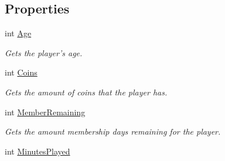 \subsection*{Properties}
\begin{DoxyCompactItemize}
\item 
\hypertarget{classSharpenguin_1_1Data_1_1MyPlayer_ae78b8a9ecf05afedb7baed1336e82dee}{int \hyperlink{classSharpenguin_1_1Data_1_1MyPlayer_ae78b8a9ecf05afedb7baed1336e82dee}{Age}}\label{classSharpenguin_1_1Data_1_1MyPlayer_ae78b8a9ecf05afedb7baed1336e82dee}

\begin{DoxyCompactList}\small\item\em Gets the player's age. \end{DoxyCompactList}\item 
\hypertarget{classSharpenguin_1_1Data_1_1MyPlayer_a3f6ac8fc09a165c81a23d25ff016b7e2}{int \hyperlink{classSharpenguin_1_1Data_1_1MyPlayer_a3f6ac8fc09a165c81a23d25ff016b7e2}{Coins}}\label{classSharpenguin_1_1Data_1_1MyPlayer_a3f6ac8fc09a165c81a23d25ff016b7e2}

\begin{DoxyCompactList}\small\item\em Gets the amount of coins that the player has. \end{DoxyCompactList}\item 
\hypertarget{classSharpenguin_1_1Data_1_1MyPlayer_acffca37897a5d514aba1eb8156b67813}{int \hyperlink{classSharpenguin_1_1Data_1_1MyPlayer_acffca37897a5d514aba1eb8156b67813}{Member\-Remaining}}\label{classSharpenguin_1_1Data_1_1MyPlayer_acffca37897a5d514aba1eb8156b67813}

\begin{DoxyCompactList}\small\item\em Gets the amount membership days remaining for the player. \end{DoxyCompactList}\item 
\hypertarget{classSharpenguin_1_1Data_1_1MyPlayer_aa706275c546c3c0d4dddb6e2258ab3a4}{int \hyperlink{classSharpenguin_1_1Data_1_1MyPlayer_aa706275c546c3c0d4dddb6e2258ab3a4}{Minutes\-Played}}\label{classSharpenguin_1_1Data_1_1MyPlayer_aa706275c546c3c0d4dddb6e2258ab3a4}


\end{DoxyCompactItemize}
